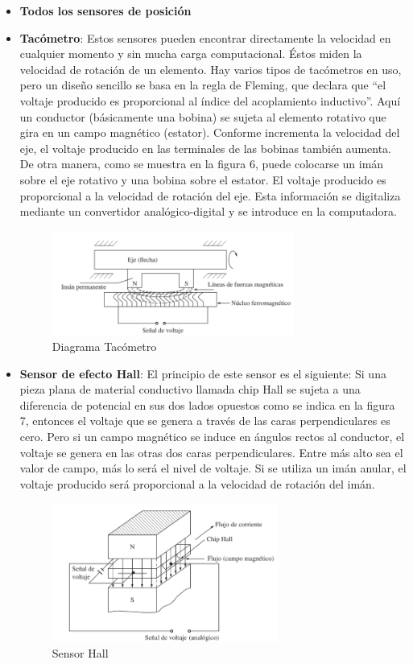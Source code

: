 \begin{itemize}
	\item \textbf{Todos los sensores de posición}
	\item \textbf{Tacómetro}: Estos sensores pueden encontrar directamente la velocidad en cualquier momento y sin mucha carga computacional. Éstos miden la velocidad de rotación de un elemento. Hay varios tipos de tacómetros en uso, pero un diseño sencillo se basa en la regla de Fleming, que declara que “el voltaje producido es proporcional al índice del acoplamiento inductivo”. Aquí un conductor (básicamente una bobina) se sujeta al elemento rotativo que gira en un campo magnético (estator). Conforme incrementa la velocidad del eje, el voltaje producido en las terminales de las bobinas también aumenta. De otra manera, como se muestra en la figura 6, puede colocarse un imán sobre el eje rotativo y una bobina sobre el estator. El voltaje producido es proporcional a la velocidad de rotación del eje. Esta información se digitaliza mediante un convertidor analógico-digital y se introduce en la computadora.
	\begin{figure}[H]
		\centering
		\includegraphics[width=0.75\textwidth]{img/Diagramatacometro.png}
		\caption{Diagrama Tacómetro}
	\end{figure}
	
	
	\item \textbf{Sensor de efecto Hall}: El  principio de este sensor es el siguiente: Si una pieza plana de material conductivo llamada chip Hall se sujeta a una diferencia de potencial en sus dos lados opuestos como se indica en la figura 7, entonces el voltaje que se genera a través de las caras perpendiculares es cero. Pero si un campo magnético se induce en ángulos rectos al conductor, el voltaje se genera en las otras dos caras perpendiculares. Entre más alto sea el valor de campo, más lo será el nivel de voltaje. Si se utiliza un imán anular, el voltaje producido será proporcional a la velocidad de rotación del imán. 
	\begin{figure}[H]
		\centering
		\includegraphics[width=0.7\textwidth]{img/sensorhall.png}
		\caption{Sensor Hall}
	\end{figure}
	
\end{itemize}
